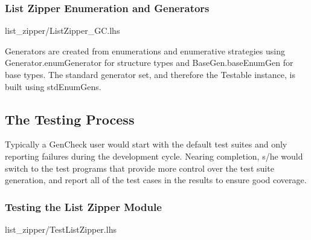 \subsubsection{List Zipper Enumeration and Generators}

 {list_zipper/ListZipper_GC.lhs}

Generators are created from enumerations and enumerative strategies
using Generator.enumGenerator for structure types and BaseGen.baseEnumGen for base types.
The standard generator set, and therefore the Testable instance, is built using stdEnumGens.

\subsection{The Testing Process}
Typically a GenCheck user would start with the default test suites
and only reporting failures during the development cycle.
Nearing completion, s/he would switch to the test programs 
that provide more control over the test suite generation,
and report all of the test cases in the results to ensure good coverage.


\subsubsection{Testing the List Zipper Module}
 {list_zipper/TestListZipper.lhs}




